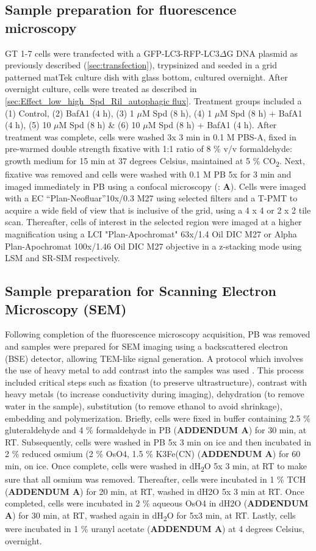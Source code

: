 \subsection{Sample preparation for fluorescence microscopy}
GT 1-7 cells were transfected with a GFP-LC3-RFP-LC3$\Delta$G DNA plasmid as previously described (\cref{sec:transfection}), trypsinized and seeded in a grid patterned matTek culture dish with glass bottom, cultured overnight. After overnight culture, cells were treated as described in \cref{sec:Effect_low_high_Spd_Ril_autophagic flux}. Treatment groups included a (1) Control, (2) BafA1 (4 h), (3) 1 $\mu$M Spd (8 h), (4) 1 $\mu$M Spd (8 h) + BafA1 (4 h), (5) 10 $\mu$M Spd (8 h) \& (6) 10 $\mu$M Spd (8 h) + BafA1 (4 h). After treatment was complete, cells were washed 3x 3 min in 0.1 M PBS-A, fixed in pre-warmed double strength fixative with 1:1 ratio of 8 \% v/v formaldehyde: growth medium for 15 min at 37 degrees Celsius, maintained at 5 \% CO\textsubscript{2}. Next, fixative was removed and cells were washed with 0.1 M PB 5x for 3 min and imaged immediately in PB using a confocal microscopy (: \textbf{A}). Cells were imaged with a EC “Plan-Neofluar”10x/0.3 M27 using selected filters and a T-PMT to acquire a wide field of view that is inclusive of the grid, using a 4 x 4 or 2 x 2 tile scan. Thereafter, cells of interest in the selected region were imaged at a higher magnification using a LCI "Plan-Apochromat" 63x/1.4 Oil DIC M27 or Alpha Plan-Apochromat 100x/1.46 Oil DIC M27 objective in a z-stacking mode using LSM and SR-SIM respectively. 

\subsection{Sample preparation for Scanning Electron Microscopy (SEM)}
Following completion of the fluorescence microscopy acquisition, PB was removed and samples were prepared for SEM imaging using a backscattered electron (BSE) detector, allowing TEM-like signal generation. A protocol which involves the use of heavy metal to add contrast into the samples was used \citep{Russell2017}. This process included critical steps such as fixation (to preserve ultrastructure), contrast with heavy metals (to increase conductivity during imaging), dehydration (to remove water in the sample), substitution (to remove ethanol to avoid shrinkage), embedding and polymerization. Briefly, cells were fixed in buffer containing 2.5 \% gluteraldehyde and 4 \% formaldehyde in PB (\textbf{ADDENDUM A}) for 30 min, at RT. Subsequently, cells were washed in PB 5x 3 min on ice and then incubated in 2 \% reduced osmium (2 \% OsO4, 1.5 \% K3Fe(CN) (\textbf{ADDENDUM A}) for 60 min, on ice. Once complete, cells were washed in dH\textsubscript{2}O 5x 3 min, at RT to make sure that all osmium was removed. Thereafter, cells were incubated in 1 \% TCH (\textbf{ADDENDUM A}) for 20 min, at RT, washed in dH2O 5x 3 min at RT. Once completed, cells were incubated in 2 \% aqueous OsO4 in dH2O (\textbf{ADDENDUM A}) for 30 min, at RT, washed again in dH\textsubscript{2}O for 5x3 min, at RT. Lastly, cells were incubated in 1 \% uranyl acetate (\textbf{ADDENDUM A}) at 4 degrees Celsius, overnight.


